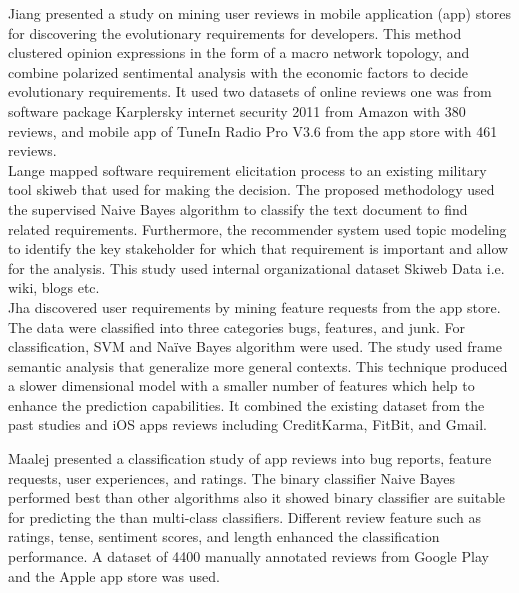  Jiang \etal \cite{Jiang:2014} presented a study on mining user reviews in mobile application (app) stores for
discovering the evolutionary requirements for developers. This method clustered opinion expressions in the form of a macro network
topology, and combine polarized sentimental analysis with the economic factors
to decide evolutionary requirements. It used two datasets of online reviews one was from software package Karplersky internet security 2011 from Amazon with 380 reviews, and mobile app of TuneIn Radio Pro V3.6 from the app store with 461 reviews.\\

Lange \etal\cite{Douglas:S2008} mapped software requirement elicitation process to an
existing military tool skiweb that used for making the decision. The proposed
methodology used the supervised Naive Bayes algorithm to classify the text document
to find related requirements. Furthermore, the recommender system used topic modeling to
identify the key stakeholder for which that requirement is important and allow
for the analysis. This study used internal organizational dataset Skiweb Data i.e. wiki, blogs etc.\\

Jha \etal \cite{Jha:2017} discovered user requirements by mining
feature requests from the app store. The data were classified into three categories bugs,
features, and junk. For classification, SVM and Naïve Bayes algorithm were used.
The study used frame semantic analysis that generalize more general contexts.
This technique produced a slower dimensional model with a smaller number of
features which help to enhance the prediction capabilities. It combined the existing dataset from the past studies and iOS apps reviews including CreditKarma, FitBit, and Gmail.

Maalej \cite{Maalej} presented a classification study of app reviews into bug reports, feature requests, user experiences, and
ratings. The binary classifier Naive Bayes performed best than other algorithms also it showed binary classifier are suitable for predicting the than multi-class classifiers. Different review feature such as ratings, tense, sentiment scores, and length enhanced the classification performance. A dataset of 4400 manually annotated reviews from Google Play and the Apple app store was used. \\

